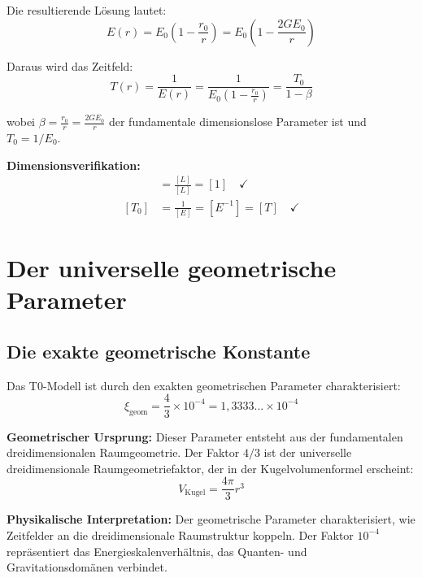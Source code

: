 \documentclass[12pt,a4paper]{report}
\newcommand{\rzero}{r_0}                  %
\newcommand{\xigeom}{\xi_{\text{geom}}}   %
\begin{document}
	Die resultierende Lösung lautet:
	\begin{equation}
		\boxed{E(r) = E_0\left(1 - \frac{\rzero}{r}\right) = E_0\left(1 - \frac{2GE_0}{r}\right)}
		\label{eq:complete_energy_solution}
	\end{equation}
	
	Daraus wird das Zeitfeld:
	\begin{equation}
		T(r) = \frac{1}{E(r)} = \frac{1}{E_0\left(1 - \frac{\rzero}{r}\right)} = \frac{T_0}{1 - \beta}
		\label{eq:time_field_solution}
	\end{equation}
	
	wobei $\beta = \frac{\rzero}{r} = \frac{2GE_0}{r}$ der fundamentale dimensionslose Parameter ist und $T_0 = 1/E_0$.
	
	\textbf{Dimensionsverifikation:}
	\begin{align}
		[\beta] &= \frac{[L]}{[L]} = [1] \quad \checkmark \\
		[T_0] &= \frac{1}{[E]} = [E^{-1}] = [T] \quad \checkmark
	\end{align}
	
	\section{Der universelle geometrische Parameter}\label{sec:universal_geometric_parameter}
	
	\subsection{Die exakte geometrische Konstante}\label{subsec:exact_geometric_constant}
	
	Das T0-Modell ist durch den exakten geometrischen Parameter charakterisiert:
	\begin{equation}
		\boxed{\xigeom = \frac{4}{3} \times 10^{-4} = 1,3333... \times 10^{-4}}
		\label{eq:geometric_parameter}
	\end{equation}
	
	\textbf{Geometrischer Ursprung:} Dieser Parameter entsteht aus der fundamentalen dreidimensionalen Raumgeometrie. Der Faktor $4/3$ ist der universelle dreidimensionale Raumgeometriefaktor, der in der Kugelvolumenformel erscheint:
	\begin{equation}
		V_{\text{Kugel}} = \frac{4\pi}{3}r^3
	\end{equation}
	
	\textbf{Physikalische Interpretation:} Der geometrische Parameter charakterisiert, wie Zeitfelder an die dreidimensionale Raumstruktur koppeln. Der Faktor $10^{-4}$ repräsentiert das Energieskalenverhältnis, das Quanten- und Gravitationsdomänen verbindet.
	
\end{document}
